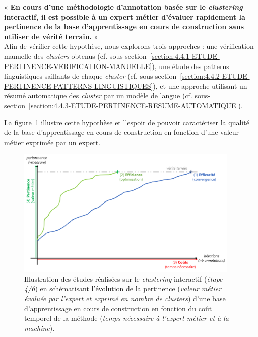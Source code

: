 	\begin{tcolorbox}[
		title=\faVial~\textbf{Hypothèse de pertinence}~\faVial,
		colback=colorTcolorboxHypothesis!15,  %
		colframe=colorTcolorboxHypothesis!75,  %
		width=\linewidth
	]
		« \textbf{
			En cours d'une méthodologie d'annotation basée sur le \textit{clustering} interactif, il est possible à un expert métier d'évaluer rapidement la pertinence de la base d'apprentissage en cours de construction sans utiliser de vérité terrain.
		} » \\
		
		Afin de vérifier cette hypothèse, nous explorons trois approches : une vérification manuelle des \textit{clusters} obtenus (cf. sous-section~\ref{section:4.4.1-ETUDE-PERTINENCE-VERIFICATION-MANUELLE}), une étude des patterns linguistiques saillants de chaque \textit{cluster} (cf. sous-section~\ref{section:4.4.2-ETUDE-PERTINENCE-PATTERNS-LINGUISTIQUES}), et une approche utilisant un résumé automatique des \textit{cluster} par un modèle de langue (cf. sous-section~\ref{section:4.4.3-ETUDE-PERTINENCE-RESUME-AUTOMATIQUE}).
		
		La figure~\ref{figure:4.4-HYPOTHESE-PERTINENCE} illustre cette hypothèse et l'espoir de pouvoir caractériser la qualité de la base d'apprentissage en cours de construction en fonction d'une valeur métier exprimée par un expert.
		\begin{figure}[H]  %
			\centering
			\includegraphics[width=0.95\textwidth]{figures/hypotheses-04-pertinence}
			\caption{Illustration des études réalisées sur le \textit{clustering} interactif (\textit{étape 4/6}) en schématisant l'évolution de la pertinence (\textit{valeur métier évaluée par l'expert et exprimé en nombre de clusters}) d'une base d'apprentissage en cours de construction en fonction du coût temporel de la méthode (\textit{temps nécessaire à l'expert métier et à la machine}).}
			\label{figure:4.4-HYPOTHESE-PERTINENCE}
		\end{figure}

	\end{tcolorbox}
	

